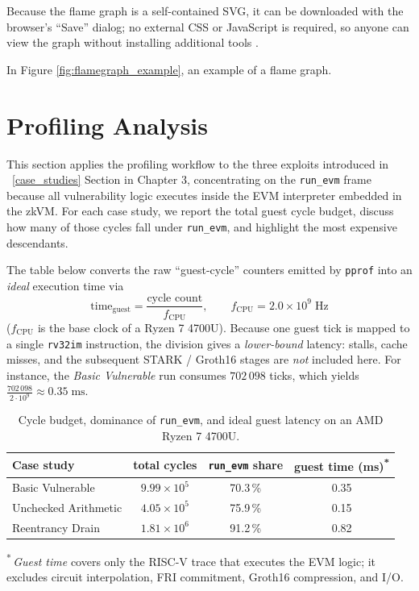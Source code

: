 Because the flame graph is a self-contained SVG, it can be downloaded with the
browser’s “Save” dialog; no external CSS or JavaScript is required, so anyone
can view the graph without installing additional tools \cite{pprof_flamegraph,gregg_diff_flamegraphs}.

In Figure \ref{fig:flamegraph_example}, an example of a flame graph.

\section{Profiling Analysis} \label{proof_analysis}
This section applies the profiling workflow to the three exploits introduced in ~\ref{case_studies} Section in Chapter 3, concentrating on the \texttt{run\_evm} frame because all vulnerability logic executes inside the EVM interpreter embedded in the zkVM. For each case study, we report the total guest cycle budget, discuss how many of those cycles fall under \texttt{run\_evm}, and highlight the most expensive descendants. 

The table below converts the raw “guest-cycle” counters emitted by
\texttt{pprof} into an \emph{ideal} execution time via
\[
\text{time}_{\mathrm{guest}}
       =\frac{\text{cycle count}}{f_{\mathrm{CPU}}},
       \qquad f_{\mathrm{CPU}}=2.0\times10^{9}\;\text{Hz}
\]
($f_{\mathrm{CPU}}$ is the base clock of a Ryzen 7 4700U). Because one guest tick is mapped to a single \texttt{rv32im} instruction, the division gives a \textit{lower-bound} latency: stalls, cache misses, and the subsequent STARK /
Groth16 stages are \emph{not} included here.  For instance, the \textit{Basic Vulnerable} run consumes \(702\,098\) ticks, which yields \(\tfrac{702\,098}{2\cdot10^{9}}\approx0.35\;\text{ms}\).

\begin{table}[h]
\centering
\begin{tabular}{|l|c|c|c|}
\hline
\textbf{Case study} & \textbf{total cycles} & \textbf{\texttt{run\_evm} share} & \textbf{guest time (ms)\textsuperscript{*}} \\\hline
Basic Vulnerable      & \(9.99\times10^{5}\) & 70.3\,\% & 0.35 \\\hline
Unchecked Arithmetic  & \(4.05\times10^{5}\) & 75.9\,\% & 0.15 \\\hline
Reentrancy Drain      & \(1.81\times10^{6}\) & 91.2\,\% & 0.82 \\\hline
\end{tabular}
\caption{Cycle budget, dominance of \texttt{run\_evm}, and ideal guest
latency on an AMD Ryzen 7 4700U.}
\label{tbl:proofstats}
\begin{minipage}{0.9\linewidth}
\smallskip
\textsuperscript{*}\,\emph{Guest time} covers only the RISC-V trace that executes the EVM logic; it excludes circuit interpolation, FRI commitment, Groth16 compression, and I/O. 
\end{minipage}
\end{table}



